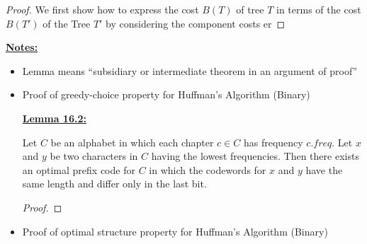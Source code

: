 \documentclass[12pt]{article}
\begin{document}
\begin{enumerate}[1.]
\begin{mdframed}
\begin{itemize}
            \bigskip

            \begin{proof}
            We first show how to express the cost $B(T)$ of tree $T$ in terms of the cost
            $B(T')$ of the Tree $T'$ by considering the component costs er
            \end{proof}


        \end{itemize}


    \end{mdframed}
    \bigskip

    \underline{\textbf{Notes:}}

    \bigskip

    \begin{itemize}
        \item Lemma means ``subsidiary or intermediate theorem in an argument of proof''
        \item Proof of greedy-choice property for Huffman's Algorithm (Binary)

        \bigskip

        \underline{\textbf{Lemma 16.2:}}

        \bigskip

        Let $C$ be an alphabet in which each chapter $c \in C$ has frequency $c.freq$. Let
        $x$ and $y$ be two characters in $C$ having the lowest frequencies. Then there exists an
        optimal prefix code for $C$ in which the codewords for $x$ and $y$ have the same
        length and differ only in the last bit.

        \bigskip

        \begin{proof}

        \end{proof}
        \item Proof of optimal structure property for Huffman's Algorithm (Binary)

        \bigskip
    \end{itemize}

\end{enumerate}
\end{document}
